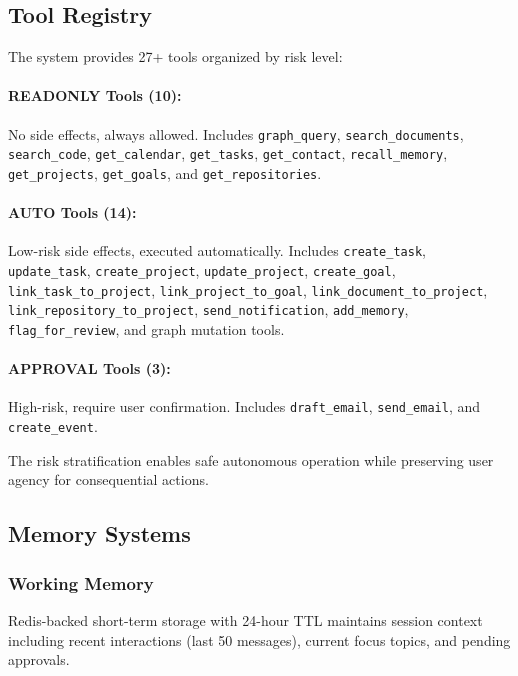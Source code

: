 \documentclass[11pt,a4paper]{article}
\begin{document}
\subsection{Tool Registry}

The system provides 27+ tools organized by risk level:

\paragraph{READONLY Tools (10):} No side effects, always allowed. Includes \texttt{graph\_query}, \texttt{search\_documents}, \texttt{search\_code}, \texttt{get\_calendar}, \texttt{get\_tasks}, \texttt{get\_contact}, \texttt{recall\_memory}, \texttt{get\_projects}, \texttt{get\_goals}, and \texttt{get\_repositories}.

\paragraph{AUTO Tools (14):} Low-risk side effects, executed automatically. Includes \texttt{create\_task}, \texttt{update\_task}, \texttt{create\_project}, \texttt{update\_project}, \texttt{create\_goal}, \texttt{link\_task\_to\_project}, \texttt{link\_project\_to\_goal}, \texttt{link\_document\_to\_project}, \texttt{link\_repository\_to\_project}, \texttt{send\_notification}, \texttt{add\_memory}, \texttt{flag\_for\_review}, and graph mutation tools.

\paragraph{APPROVAL Tools (3):} High-risk, require user confirmation. Includes \texttt{draft\_email}, \texttt{send\_email}, and \texttt{create\_event}.

The risk stratification enables safe autonomous operation while preserving user agency for consequential actions.

\subsection{Memory Systems}

\subsubsection{Working Memory}

Redis-backed short-term storage with 24-hour TTL maintains session context including recent interactions (last 50 messages), current focus topics, and pending approvals.
\end{document}
